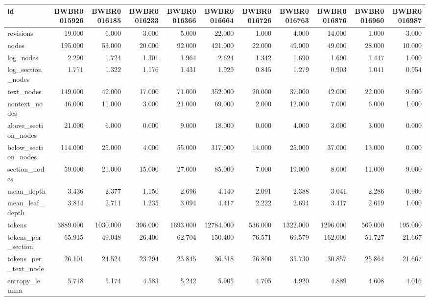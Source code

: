 \begin{tabular}{lrrrrrrrrrr}
\toprule
id & BWBR0015926 & BWBR0016185 & BWBR0016233 & BWBR0016366 & BWBR0016664 & BWBR0016726 & BWBR0016763 & BWBR0016876 & BWBR0016960 & BWBR0016987 \\
\midrule
revisions & 19.000 & 6.000 & 3.000 & 5.000 & 22.000 & 1.000 & 4.000 & 14.000 & 1.000 & 3.000 \\
\cline{1-11}
nodes & 195.000 & 53.000 & 20.000 & 92.000 & 421.000 & 22.000 & 49.000 & 49.000 & 28.000 & 10.000 \\
\cline{1-11}
log\_nodes & 2.290 & 1.724 & 1.301 & 1.964 & 2.624 & 1.342 & 1.690 & 1.690 & 1.447 & 1.000 \\
\cline{1-11}
log\_section\_nodes & 1.771 & 1.322 & 1.176 & 1.431 & 1.929 & 0.845 & 1.279 & 0.903 & 1.041 & 0.954 \\
\cline{1-11}
text\_nodes & 149.000 & 42.000 & 17.000 & 71.000 & 352.000 & 20.000 & 37.000 & 42.000 & 22.000 & 9.000 \\
\cline{1-11}
nontext\_nodes & 46.000 & 11.000 & 3.000 & 21.000 & 69.000 & 2.000 & 12.000 & 7.000 & 6.000 & 1.000 \\
\cline{1-11}
above\_section\_nodes & 21.000 & 6.000 & 0.000 & 9.000 & 18.000 & 0.000 & 4.000 & 3.000 & 3.000 & 0.000 \\
\cline{1-11}
below\_section\_nodes & 114.000 & 25.000 & 4.000 & 55.000 & 317.000 & 14.000 & 25.000 & 37.000 & 13.000 & 0.000 \\
\cline{1-11}
section\_nodes & 59.000 & 21.000 & 15.000 & 27.000 & 85.000 & 7.000 & 19.000 & 8.000 & 11.000 & 9.000 \\
\cline{1-11}
mean\_depth & 3.436 & 2.377 & 1.150 & 2.696 & 4.140 & 2.091 & 2.388 & 3.041 & 2.286 & 0.900 \\
\cline{1-11}
mean\_leaf\_depth & 3.814 & 2.711 & 1.235 & 3.094 & 4.417 & 2.222 & 2.694 & 3.417 & 2.619 & 1.000 \\
\cline{1-11}
tokens & 3889.000 & 1030.000 & 396.000 & 1693.000 & 12784.000 & 536.000 & 1322.000 & 1296.000 & 569.000 & 195.000 \\
\cline{1-11}
tokens\_per\_section & 65.915 & 49.048 & 26.400 & 62.704 & 150.400 & 76.571 & 69.579 & 162.000 & 51.727 & 21.667 \\
\cline{1-11}
tokens\_per\_text\_node & 26.101 & 24.524 & 23.294 & 23.845 & 36.318 & 26.800 & 35.730 & 30.857 & 25.864 & 21.667 \\
\cline{1-11}
entropy\_lemma & 5.718 & 5.174 & 4.583 & 5.242 & 5.905 & 4.705 & 4.920 & 4.889 & 4.608 & 4.016 \\

\end{tabular}
